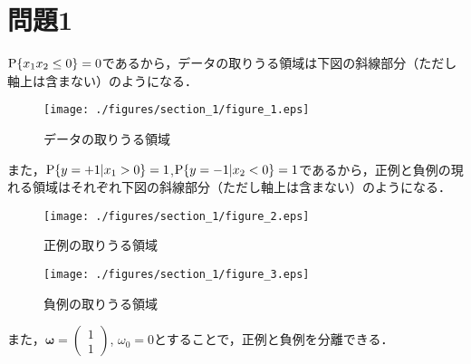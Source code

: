 \section*{問題1}
${\rm P}\{x_1x_2\leq 0\}=0$であるから，データの取りうる領域は下図の斜線部分（ただし軸上は含まない）のようになる．
\begin{figure}[H]
    \begin{center}
        \texttt{[image: ./figures/section\_1/figure\_1.eps]}
        \caption{データの取りうる領域}
    \end{center}
\end{figure}
また，${\rm P}\{y=+1|x_1>0\}=1$,${\rm P}\{y=-1|x_2<0\}=1$であるから，正例と負例の現れる領域はそれぞれ下図の斜線部分（ただし軸上は含まない）のようになる．
\begin{figure}[H]
    \begin{minipage}{0.5\hsize}
        \begin{center}
            \texttt{[image: ./figures/section\_1/figure\_2.eps]}
            \caption{正例の取りうる領域}
        \end{center}
    \end{minipage}
    \begin{minipage}{0.5\hsize}
        \begin{center}
            \texttt{[image: ./figures/section\_1/figure\_3.eps]}
            \caption{負例の取りうる領域}
        \end{center}
    \end{minipage}
\end{figure}
また，$\bm{\omega}=\left(\begin{array}{c}1\\ 1\end{array}\right)$, $\omega_0=0$とすることで，正例と負例を分離できる．